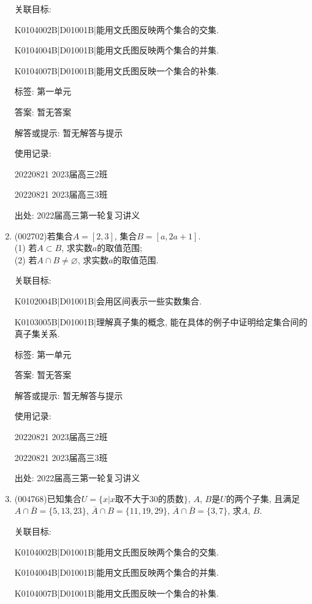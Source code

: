 \documentclass[10pt,a4paper]{article}
\begin{document}
\begin{enumerate}[1.]
关联目标:

K0104002B|D01001B|能用文氏图反映两个集合的交集.

K0104004B|D01001B|能用文氏图反映两个集合的并集.

K0104007B|D01001B|能用文氏图反映一个集合的补集.



标签: 第一单元

答案: 暂无答案

解答或提示: 暂无解答与提示

使用记录:

20220821	2023届高三2班	

20220821	2023届高三3班	


出处: 2022届高三第一轮复习讲义
\item { (002702)}若集合$A=[2,3]$, 集合$B=[a,2a+1]$.\\
(1) 若$A\subset B$, 求实数$a$的取值范围;\\
(2) 若$A\cap B\ne \varnothing$, 求实数$a$的取值范围.


关联目标:

K0102004B|D01001B|会用区间表示一些实数集合.

K0103005B|D01001B|理解真子集的概念, 能在具体的例子中证明给定集合间的真子集关系.



标签: 第一单元

答案: 暂无答案

解答或提示: 暂无解答与提示

使用记录:

20220821	2023届高三2班		

20220821	2023届高三3班		


出处: 2022届高三第一轮复习讲义
\item { (004768)}已知集合$U =\{x|x\text{取不大于}30\text{的质数}\}$, $A$, $B$是$U$的两个子集, 且满足$A\cap \overline B=\{5,13,23\}$, $\overline A\cap B=\{11,19,29\}$, $\overline A\cap \overline B=\{3,7\}$, 求$A$, $B$.


关联目标:

K0104002B|D01001B|能用文氏图反映两个集合的交集.

K0104004B|D01001B|能用文氏图反映两个集合的并集.

K0104007B|D01001B|能用文氏图反映一个集合的补集.




\end{enumerate}
\end{document}
